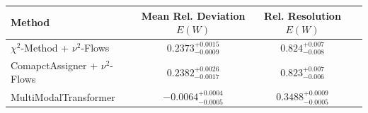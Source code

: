     \begin{tabular}{lccc}
        \toprule
        Method & Mean Rel. Deviation $E(W)$ & Rel. Resolution $E(W)$ \\
        \midrule
        $\chi^2$-Method + $\nu^2$-Flows & $0.2373^{+0.0015}_{-0.0009}$ & $0.824^{+0.007}_{-0.008}$ \\
        ComapctAssigner + $\nu^2$-Flows & $0.2382^{+0.0026}_{-0.0017}$ & $0.823^{+0.007}_{-0.006}$ \\
        MultiModalTransformer & $-0.0064^{+0.0004}_{-0.0005}$ & $0.3488^{+0.0009}_{-0.0005}$ \\
        \bottomrule
    \end{tabular}